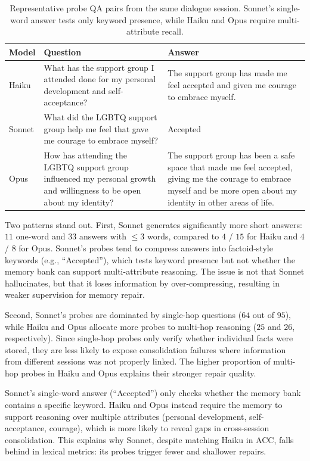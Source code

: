 \begin{table}[t]
\centering
\small
\caption{Representative probe QA pairs from the same dialogue session. Sonnet's single-word answer tests only keyword presence, while Haiku and Opus require multi-attribute recall.}
\label{tab:probe_examples}
\begin{tabular}{p{1.2cm}p{5.5cm}p{5.5cm}}
\toprule
\textbf{Model} & \textbf{Question} & \textbf{Answer} \\
\midrule
Haiku & What has the support group I attended done for my personal development and self-acceptance? & The support group has made me feel accepted and given me courage to embrace myself. \\
\midrule
Sonnet & What did the LGBTQ support group help me feel that gave me courage to embrace myself? & Accepted \\
\midrule
Opus & How has attending the LGBTQ support group influenced my personal growth and willingness to be open about my identity? & The support group has been a safe space that made me feel accepted, giving me the courage to embrace myself and be more open about my identity in other areas of life. \\
\bottomrule
\end{tabular}
\end{table}

Two patterns stand out.
First, Sonnet generates significantly more short answers: $11$ one-word and $33$ answers with $\leq 3$ words, compared to $4$ / $15$ for Haiku and $4$ / $8$ for Opus.
Sonnet's probes tend to compress answers into factoid-style keywords (e.g., ``Accepted''), which tests keyword presence but not whether the memory bank can support multi-attribute reasoning.
The issue is not that Sonnet hallucinates, but that it loses information by over-compressing, resulting in weaker supervision for memory repair.

Second, Sonnet's probes are dominated by single-hop questions ($64$ out of $95$), while Haiku and Opus allocate more probes to multi-hop reasoning ($25$ and $26$, respectively).
Since single-hop probes only verify whether individual facts were stored, they are less likely to expose consolidation failures where information from different sessions was not properly linked.
The higher proportion of multi-hop probes in Haiku and Opus explains their stronger repair quality.

Sonnet's single-word answer (``Accepted'') only checks whether the memory bank contains a specific keyword.
Haiku and Opus instead require the memory to support reasoning over multiple attributes (personal development, self-acceptance, courage), which is more likely to reveal gaps in cross-session consolidation.
This explains why Sonnet, despite matching Haiku in ACC, falls behind in lexical metrics: its probes trigger fewer and shallower repairs.

